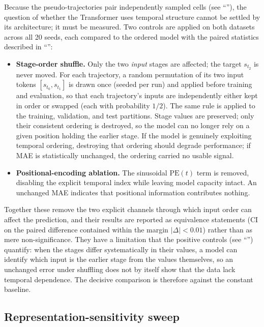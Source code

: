 \documentclass[10pt,letterpaper]{article}
\begin{document}
Because the pseudo-trajectories pair independently sampled cells (see ``''), the question of whether the Transformer uses temporal structure cannot be settled by its architecture; it must be measured. Two controls are applied on both datasets across all 20 seeds, each compared to the ordered model with the paired statistics described in ``'':
\begin{itemize}
    \item \textbf{Stage-order shuffle.} Only the two \emph{input} stages are affected; the target $s_{t_2}$ is never moved. For each trajectory, a random permutation of its two input tokens $[s_{t_0},s_{t_1}]$ is drawn once (seeded per run) and applied before training and evaluation, so that each trajectory's inputs are independently either kept in order or swapped (each with probability $1/2$). The same rule is applied to the training, validation, and test partitions. Stage values are preserved; only their consistent ordering is destroyed, so the model can no longer rely on a given position holding the earlier stage. If the model is genuinely exploiting temporal ordering, destroying that ordering should degrade performance; if MAE is statistically unchanged, the ordering carried no usable signal.
    \item \textbf{Positional-encoding ablation.} The sinusoidal $\mathrm{PE}(t)$ term is removed, disabling the explicit temporal index while leaving model capacity intact. An unchanged MAE indicates that positional information contributes nothing.
\end{itemize}
Together these remove the two explicit channels through which input order can affect the prediction, and their results are reported as equivalence statements (CI on the paired difference contained within the margin $|\Delta|<0.01$) rather than as mere non-significance. They have a limitation that the positive controls (see ``'') quantify: when the stages differ systematically in their values, a model can identify which input is the earlier stage from the values themselves, so an unchanged error under shuffling does not by itself show that the data lack temporal dependence. The decisive comparison is therefore against the constant baseline.

\subsection*{Representation-sensitivity sweep}
\label{subsec:sensitivity}
\end{document}
